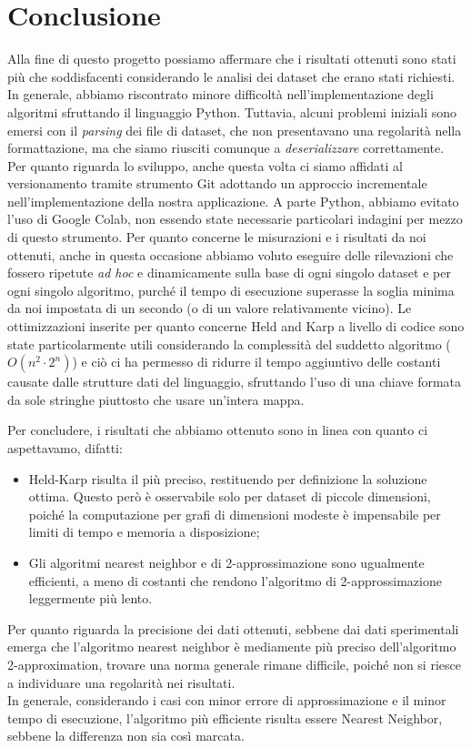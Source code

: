 \section{Conclusione}

Alla fine di questo progetto possiamo affermare che i risultati ottenuti sono stati più che soddisfacenti considerando le analisi dei dataset che erano stati richiesti. In generale, abbiamo riscontrato minore difficoltà nell'implementazione degli algoritmi sfruttando il linguaggio Python. Tuttavia, alcuni problemi iniziali sono emersi con il \textit{parsing} dei file di dataset, che non presentavano una regolarità nella formattazione, ma che siamo riusciti comunque a \textit{deserializzare} correttamente. \\
Per quanto riguarda lo sviluppo, anche questa volta ci siamo affidati al versionamento tramite strumento Git adottando un approccio incrementale nell'implementazione della nostra applicazione. A parte Python, abbiamo evitato l'uso di Google Colab, non essendo state necessarie particolari indagini per mezzo di questo strumento. 
Per quanto concerne le misurazioni e i risultati da noi ottenuti, anche in questa occasione abbiamo voluto eseguire delle rilevazioni che fossero ripetute \textit{ad hoc} e dinamicamente sulla base di ogni singolo dataset e per ogni singolo algoritmo, purché il tempo di esecuzione superasse la soglia minima da noi impostata di un secondo (o di un valore relativamente vicino).
Le ottimizzazioni inserite per quanto concerne Held and Karp a livello di codice sono state particolarmente utili considerando la complessità del suddetto algoritmo (\(O(n^2\cdot2^n)\)) e ciò ci ha permesso di ridurre il tempo aggiuntivo delle costanti causate dalle strutture dati del linguaggio, sfruttando l'uso di una chiave formata da sole stringhe piuttosto che usare un'intera mappa. 

\noindent Per concludere, i risultati che abbiamo ottenuto sono in linea con quanto ci aspettavamo, difatti:
\begin{itemize}
  \item Held-Karp risulta il più preciso, restituendo per definizione la soluzione ottima. Questo però è osservabile solo per dataset di piccole dimensioni, poiché la computazione per grafi di dimensioni modeste è impensabile per limiti di tempo e memoria a disposizione;
  \item Gli algoritmi nearest neighbor e di 2-approssimazione sono ugualmente efficienti, a meno di costanti che rendono l'algoritmo di 2-approssimazione leggermente più lento.
\end{itemize}

Per quanto riguarda la precisione dei dati ottenuti, sebbene dai dati sperimentali emerga che l'algoritmo nearest neighbor è mediamente più preciso dell'algoritmo 2-approximation, trovare una norma generale rimane difficile, poiché non si riesce a individuare una regolarità nei risultati. \\
In generale, considerando i casi con minor errore di approssimazione e il minor tempo di esecuzione, l'algoritmo più efficiente risulta essere Nearest Neighbor, sebbene la differenza non sia così marcata. 